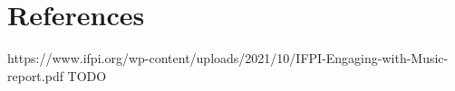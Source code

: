 \documentclass[fontsize=11pt]{article}
\begin{document}
\section*{References}
https://www.ifpi.org/wp-content/uploads/2021/10/IFPI-Engaging-with-Music-report.pdf
TODO

\end{document}
